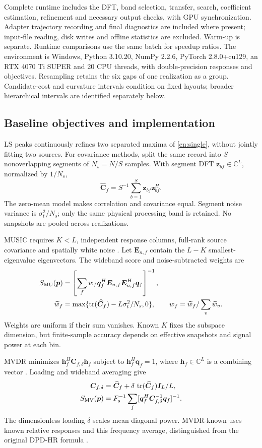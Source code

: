\documentclass[a4paper,fleqn,review]{cas-sc}
\newcommand{\C}{\mathbb C}
\newcommand{\tr}{\operatorname{tr}}
\begin{document}
Complete runtime includes the DFT, band selection, transfer, search, coefficient estimation, refinement and necessary output checks, with GPU synchronization. Adapter trajectory recording and final diagnostics are included where present; input-file reading, disk writes and offline statistics are excluded. Warm-up is separate. Runtime comparisons use the same batch for speedup ratios. The environment is Windows, Python 3.10.20, NumPy 2.2.6, PyTorch 2.8.0+cu129, an RTX 4070 Ti SUPER and 20 CPU threads, with double-precision responses and objectives. Resampling retains the six gaps of one realization as a group. Candidate-cost and curvature intervals condition on fixed layouts; broader hierarchical intervals are identified separately below.

\FloatBarrier
\subsection{Baseline objectives and implementation}
LS peaks continuously refines two separated maxima of \eqref{en:single}, without jointly fitting two sources. For covariance methods, split the same record into $S$ nonoverlapping segments of $N_s=N/S$ samples. With segment DFT $\bm z_{bf}\in\C^L$, normalized by $1/N_s$,
\begin{equation}
\widehat{\bm C}_f=S^{-1}\sum_{b=1}^S\bm z_{bf}\bm z_{bf}^H.
\end{equation}
The zero-mean model makes correlation and covariance equal. Segment noise variance is $\sigma_t^2/N_s$; only the same physical processing band is retained. No snapshots are pooled across realizations.

MUSIC requires $K<L$, independent response columns, full-rank source covariance and spatially white noise \cite{WeissAmar2005}. Let $\bm E_{n,f}$ contain the $L-K$ smallest-eigenvalue eigenvectors. The wideband score and noise-subtracted weights are
\begin{align}
S_{\rm MU}(\bm p)&=\left[\sum_f w_f\bm q_f^H
\bm E_{n,f}\bm E_{n,f}^H\bm q_f\right]^{-1},\\
\widetilde w_f&=\max\{\tr(\widehat{\bm C}_f)-L\sigma_t^2/N_s,0\},
\qquad w_f=\widetilde w_f/\sum_v\widetilde w_v.
\end{align}
Weights are uniform if their sum vanishes. Known $K$ fixes the subspace dimension, but finite-sample accuracy depends on effective snapshots and signal power at each bin.

MVDR minimizes $\bm h_f^H\bm C_{f,\delta}\bm h_f$ subject to $\bm h_f^H\bm q_f=1$, where $\bm h_f\in\C^L$ is a combining vector \cite{Capon1969}. Loading and wideband averaging give
\begin{equation}
\begin{split}
\bm C_{f,\delta}&=\widehat{\bm C}_f+
\delta\,\tr(\widehat{\bm C}_f)\bm I_L/L,\\
S_{\rm MV}(\bm p)&=F_s^{-1}\sum_f
[\bm q_f^H\bm C_{f,\delta}^{-1}\bm q_f]^{-1}.
\end{split}
\end{equation}
The dimensionless loading $\delta$ scales mean diagonal power. MVDR-known uses known relative responses and this frequency average, distinguished from the original DPD-HR formula \cite{TirerWeiss2016}.
\end{document}

